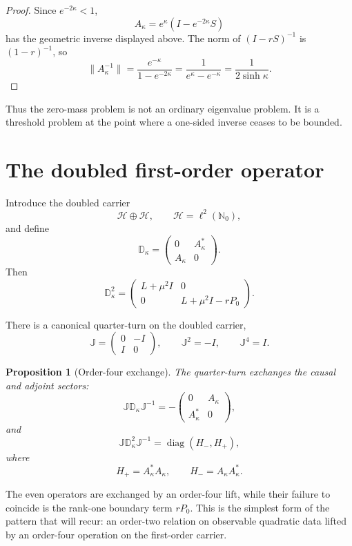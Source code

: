 \documentclass[11pt]{article}
\newtheorem{proposition}[theorem]{Proposition}
\theoremstyle{definition}
\theoremstyle{remark}
\DeclareMathOperator{\diag}{diag}
\newcommand{\N}{\mathbb N}
\newcommand{\HH}{\mathcal H}
\begin{document}
\begin{proof}
Since \(e^{-2\kappa}<1\),
\[
A_\kappa=e^\kappa(I-e^{-2\kappa}S)
\]
has the geometric inverse displayed above.  The norm of \((I-rS)^{-1}\) is
\((1-r)^{-1}\), so
\[
\|A_\kappa^{-1}\|
=\frac{e^{-\kappa}}{1-e^{-2\kappa}}
=\frac1{e^\kappa-e^{-\kappa}}
=\frac1{2\sinh\kappa}.
\]
\end{proof}

Thus the zero-mass problem is not an ordinary eigenvalue problem.  It is a threshold problem at the point where a one-sided inverse ceases to be bounded.

\section{The doubled first-order operator}

Introduce the doubled carrier
\[
\HH\oplus\HH,\qquad \HH=\ell^2(\N_0),
\]
and define
\[
\mathbb D_\kappa=
\begin{pmatrix}
0&A_\kappa^*\\
A_\kappa&0
\end{pmatrix}.
\]
Then
\[
\mathbb D_\kappa^2=
\begin{pmatrix}
L+\mu^2I&0\\
0&L+\mu^2I-rP_0
\end{pmatrix}.
\]

There is a canonical quarter-turn on the doubled carrier,
\[
\mathbb J=
\begin{pmatrix}
0&-I\\
I&0
\end{pmatrix},
\qquad
\mathbb J^2=-I,\qquad
\mathbb J^4=I.
\]

\begin{proposition}[Order-four exchange]
The quarter-turn exchanges the causal and adjoint sectors:
\[
\mathbb J\mathbb D_\kappa\mathbb J^{-1}
=
-
\begin{pmatrix}
0&A_\kappa\\
A_\kappa^*&0
\end{pmatrix},
\]
and
\[
\mathbb J\mathbb D_\kappa^2\mathbb J^{-1}
=
\diag(H_-,H_+),
\]
where
\[
H_+=A_\kappa^*A_\kappa,\qquad
H_-=A_\kappa A_\kappa^*.
\]
\end{proposition}

The even operators are exchanged by an order-four lift, while their failure to coincide is the rank-one boundary term \(rP_0\).  This is the simplest form of the pattern that will recur: an order-two relation on observable quadratic data lifted by an order-four operation on the first-order carrier.
\end{document}
